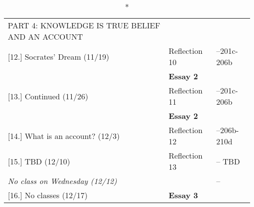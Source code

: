 \documentclass[article,oneside]{memoir}
\begin{document}
\vspace{-1.5cm}
\begin{center}
\begin{longtable}{p{6cm}p{3cm}p{5cm}}
  \caption*{PART 4: KNOWLEDGE IS TRUE BELIEF AND AN ACCOUNT} \\
  			

[12.] Socrates' Dream (11/19)			& Reflection 10		& --201c-206b \\
								& \textbf{Essay 2}	&  \\

[13.] Continued (11/26)					& Reflection 11		& --201c-206b \\
								& \textbf{Essay 2}	&  \\

						
[14.] What is an account? (12/3)	      		& Reflection 12		&  --206b-210d \\ 

			      				
[15.] TBD 	(12/10)			  		& Reflection 13		&-- TBD \\ 
\emph{No class on Wednesday (12/12)}   &	 			&--\\ 

[16.] No classes (12/17)		    		& \textbf{Essay 3}		& \\ 



\end{longtable}
\end{center}



\end{document}
